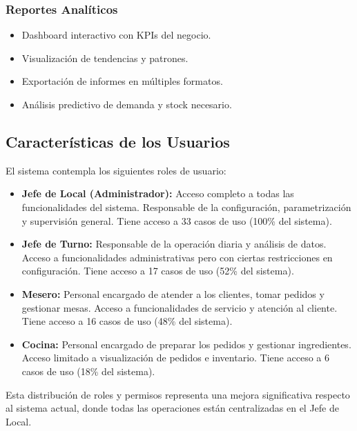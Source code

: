 \documentclass[12pt]{article}
\begin{document}
\subsubsection{Reportes Analíticos}
\begin{itemize}
  \item Dashboard interactivo con KPIs del negocio.
  \item Visualización de tendencias y patrones.
  \item Exportación de informes en múltiples formatos.
  \item Análisis predictivo de demanda y stock necesario.
\end{itemize}

\subsection{Características de los Usuarios}
El sistema contempla los siguientes roles de usuario:

\begin{itemize}
  \item \textbf{Jefe de Local (Administrador):} Acceso completo a todas las funcionalidades del sistema. Responsable de la configuración, parametrización y supervisión general. Tiene acceso a 33 casos de uso (100\% del sistema).
  
  \item \textbf{Jefe de Turno:} Responsable de la operación diaria y análisis de datos. Acceso a funcionalidades administrativas pero con ciertas restricciones en configuración. Tiene acceso a 17 casos de uso (52\% del sistema).
  
  \item \textbf{Mesero:} Personal encargado de atender a los clientes, tomar pedidos y gestionar mesas. Acceso a funcionalidades de servicio y atención al cliente. Tiene acceso a 16 casos de uso (48\% del sistema).
  
  \item \textbf{Cocina:} Personal encargado de preparar los pedidos y gestionar ingredientes. Acceso limitado a visualización de pedidos e inventario. Tiene acceso a 6 casos de uso (18\% del sistema).
\end{itemize}

Esta distribución de roles y permisos representa una mejora significativa respecto al sistema actual, donde todas las operaciones están centralizadas en el Jefe de Local.
\end{document}
